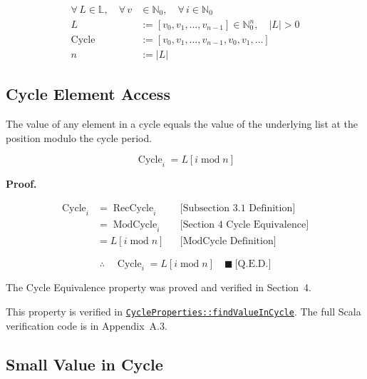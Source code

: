 \begin{equation*}
\begin{aligned}
\forall\,L\in\mathbb{L},\quad \forall\,v&\in\mathbb{N}_0,
  \quad \forall\,i\in\mathbb{N}_0 \\
L &:= [v_0,v_1,\dots,v_{n-1}]\in\mathbb{N}_0^n,\quad |L|>0 \\
\operatorname{Cycle} &:= [v_0,v_1,\dots,v_{n-1},v_0,v_1,\dots] \\
n &:= |L|
\end{aligned}
\end{equation*}

\subsection{Cycle Element Access}

The value of any element in a cycle equals the value of the underlying list at
the position modulo the cycle period.

\begin{equation*}
\operatorname{Cycle}_i=L[i\operatorname{mod}n]
\end{equation*}

\noindent\textbf{Proof.}

\begin{equation*}
\begin{aligned}
\operatorname{Cycle}_i &= \operatorname{RecCycle}_i
  && \text{[Subsection 3.1 Definition]} \\
&=\operatorname{ModCycle}_i && \text{[Section 4 Cycle Equivalence]} \\
&=L[i\operatorname{mod}n] && \text{[ModCycle Definition]}
\end{aligned}
\end{equation*}

\begin{equation*}
\therefore\quad \operatorname{Cycle}_i=L[i\operatorname{mod}n]
  \quad \blacksquare\ \text{[Q.E.D.]}
\end{equation*}

The Cycle Equivalence property was proved and verified in Section~4.

This property is verified in
\href{https://github.com/thiagomata/prime-numbers/blob/cycle-article-v1.0.0/src/main/scala/v1/chapter4/cycle/properties/CycleProperties.scala}{\texttt{CycleProperties::findValueInCycle}}.
The full Scala verification code is in Appendix~A.3.

\subsection{Small Value in Cycle}

